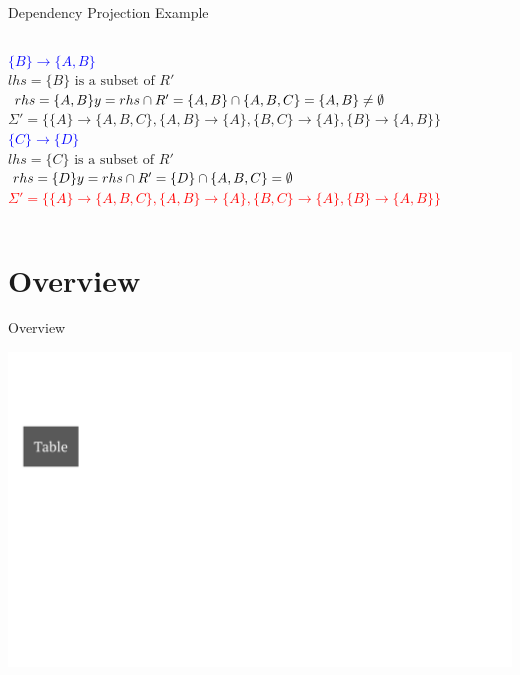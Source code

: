 \documentclass[UTF8]{beamer}
\begin{document}
\begin{frame}[fragile]{Dependency Projection Example}
\begin{columns}
\begin{column}{0.7\textwidth}
    \vspace{0.1cm}
    \pause
    \textcolor{blue}{$\{B\} \to \{A,B\}$}\\
    $lhs = \{B\} \text{ is a subset of } R'$\\
    $rhs = \{A,B\}\\
    y = rhs \cap R' = \{A,B\}\cap\{A,B,C\} = \{A,B\} \neq \emptyset$\\
    $\Sigma' = \{\{A\}\to \{A,B,C\}, \{A,B\} \to \{A\}, \{B,C\} \to \{A\}, \{B\} \to \{A,B\}\}$\\
    \vspace{0.1cm}
    \pause
    \textcolor{blue}{$\{C\} \to \{D\}$}\\
    $lhs = \{C\} \text{ is a subset of } R'$\\
    $rhs = \{D\}\\
    y = rhs \cap R' = \{D\}\cap\{A,B,C\} = \emptyset$\\
    \vspace{0.1cm}
    \pause
    \textcolor{red}{$\Sigma' = \{\{A\}\to \{A,B,C\}, \{A,B\} \to \{A\}, \{B,C\} \to \{A\}, \{B\} \to \{A,B\}\}$}
    \end{column}
\end{columns}
\end{frame}
\section{Overview}
\begin{frame}{Overview}
\begin{center}
    \includegraphics[width = 0.8\linewidth]{fd_norm_images/01.png}
\end{center}
\end{frame}
\end{document}
